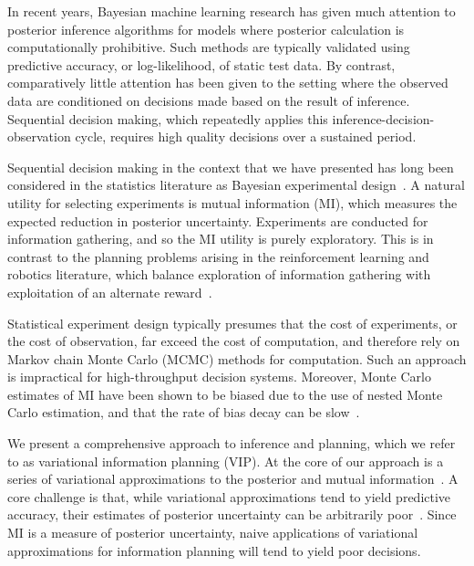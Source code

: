 In recent years, Bayesian machine learning research has given much
attention to posterior inference algorithms for models where posterior
calculation is computationally prohibitive.  Such methods are
typically validated using predictive accuracy, or log-likelihood, of
static test data.  By contrast, comparatively little attention has
been given to the setting where the observed data are conditioned on
decisions made based on the result of inference.  Sequential decision
making, which repeatedly applies this inference-decision-observation
cycle, requires high quality decisions over a sustained period.


Sequential decision making in the context that we have presented has
long been considered in the statistics literature as Bayesian
experimental design~\citep{blackwell50, lindley56, bernardo79a}.  A
natural utility for selecting experiments is mutual information (MI),
which measures the expected reduction in posterior uncertainty.
Experiments are conducted for information gathering, and so the MI
utility is purely exploratory.  This is in contrast to
the planning problems arising in the reinforcement learning and
robotics literature, which balance exploration of information
gathering with exploitation of an alternate
reward~\citep{sutton1998reinforcement}.

Statistical experiment design typically presumes that the cost of
experiments, or the cost of observation, far exceed the cost of
computation, and therefore rely on Markov chain Monte Carlo (MCMC)
methods for computation.  Such an approach is impractical for
high-throughput decision systems.  Moreover, Monte Carlo estimates of
MI have been shown to be biased due to the use of nested Monte Carlo
estimation, and that the rate of bias decay can be
slow~\citep{zheng2018robust, rainforth2018nesting}.

We present a comprehensive approach to inference and planning, which
we refer to as variational information planning (VIP).  At the core of
our approach is a series of variational approximations to the
posterior and mutual information~\citep{wainwright_jordan}.  A core
challenge is that, while variational approximations tend to yield
predictive accuracy, their estimates of posterior uncertainty can be
arbitrarily poor~\citep{giordano2015linear, turner2011two}.  Since MI
is a measure of posterior uncertainty, naive applications of
variational approximations for information planning will tend to yield
poor decisions.

